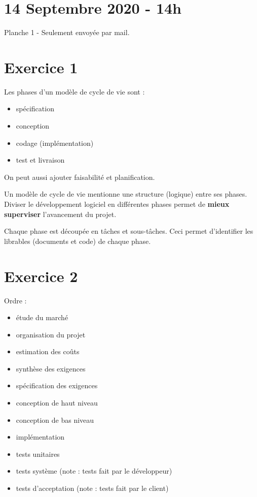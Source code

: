 \section{14 Septembre 2020 - 14h}

Planche 1 - Seulement envoyée par mail.

\section{Exercice 1}

Les phases d'un modèle de cycle de vie sont :

\begin{itemize}
\tightlist
\item spécification
\item conception
\item codage (implémentation)
\item test et livraison
\end{itemize}

On peut aussi ajouter faisabilité et planification.

Un modèle de cycle de vie mentionne une structure (logique) entre ses phases. Diviser le développement logiciel en différentes phases permet de \textbf{mieux superviser} l'avancement du projet.

Chaque phase est découpée en tâches et sous-tâches. Ceci permet d'identifier les librables (documents et code) de chaque phase.

\section{Exercice 2}

Ordre :

\begin{itemize}
\tightlist
\item étude du marché
\item organisation du projet
\item estimation des coûts
\item synthèse des exigences
\item spécification des exigences
\item conception de haut niveau
\item conception de bas niveau
\item implémentation
\item tests unitaires
\item tests système (note : tests fait par le développeur)
\item tests d'acceptation (note : tests fait par le client)
\end{itemize}

